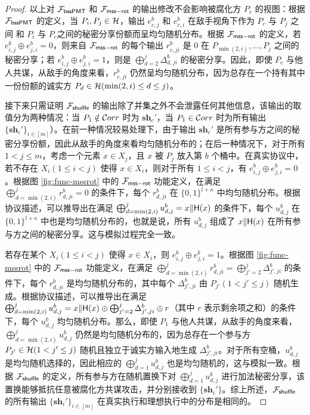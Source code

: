 \begin{proof}
以上对 $\mathcal{F}_\mathsf{bssPMT}$ 和 $\mathcal{F}_\mathsf{mss\mathsf{-}rot}$ 的输出修改不会影响被腐化方 $P_c$ 的视图：根据 $\mathcal{F}_\mathsf{bssPMT}$ 的定义，当 $P_i, P_j \in \mathcal{H}$，输出 $e_{c,j}^b$ 和 $e_{c,i}^b$ 在敌手视角下作为 $P_c$ 与 $P_j$ 之间 和 $P_i$ 与 $P_c$之间的秘密分享份额而呈均匀随机分布。根据 $\mathcal{F}_\mathsf{mss\mathsf{-}rot}$ 的定义，若 $e_{i,j}^b \oplus e_{j,i}^b = 0$，则来自 $\mathcal{F}_\mathsf{mss\mathsf{-}rot}$ 的每个输出 $r_{c,ji}^b$ 是 $0$ 在 $P_{\min(2,i)}, \dots, P_j$ 之间的秘密分享；若 $e_{i,j}^b \oplus e_{j,i}^b = 1$，则是 $\bigoplus_{d=2}^j \Delta_{d,ji}^b$ 的秘密分享。因此，即使 $P_c$ 与他人共谋，从敌手的角度来看，$r_{c,ji}^b$ 仍然呈均匀随机分布，因为总存在一个持有其中一份份额的诚实方 $P_d \in \mathcal{H} (\min(2,i) \le d \le j)$。

接下来只需证明 $\mathcal{F}_\mathsf{shuffle}$ 的输出除了并集之外不会泄露任何其他信息，该输出的取值分为两种情况：当 $P_1 \notin \mathcal{C}orr$ 时为 $\textbf{sh}_{c}'$，当 $P_1 \in \mathcal{C}orr$ 时为所有输出 $\{\textbf{sh}_{i}'\}_{i \in [m]}$）。在前一种情况较易处理下，由于输出 $\textbf{sh}_{c}'$ 是所有参与方之间的秘密分享份额，因此从敌手的角度来看均匀随机分布的；在后一种情况下，对于所有 $1 < j \le m$，考虑一个元素 $x \in X_j$，且 $x$ 被 $P_j$ 放入第 $b$ 个桶中。在真实协议中，若不存在 $X_i (1 \le i < j)$ 使得 $x \in X_i$，则对于所有 $1 \le i < j$，有 $e_{i,j}^b \oplus e_{j,i}^b = 0$。根据图 \ref{fig:func-mssrot} 中的 $\mathcal{F}_\mathsf{mss\mathsf{-}rot}$ 功能定义，在满足 $\bigoplus_{d=\min(2,i)}^j r_{d,ji}^b = 0$ 的条件下，每个 $r_{d,ji}^b$ 在 $\{0,1\}^{l+\kappa}$ 中均匀随机分布。根据协议描述，可以推导出在满足 $\bigoplus_{d=\min(2,i)}^j u_{d,j}^b = x \Vert \mathsf{H}(x)$ 的条件下，每个 $u_{d,j}^b$ 在 $\{0,1\}^{l+\kappa}$ 中也是均匀随机分布的，也就是说，所有 $u_{d,j}^b$ 组成了 $x \Vert \mathsf{H}(x)$ 在所有参与方之间的秘密分享。这与模拟过程完全一致。

若存在某个 $X_i (1 \le i < j)$ 使得 $x \in X_i$，则 $e_{i,j}^b \oplus e_{j,i}^b = 1$。根据图 \ref{fig:func-mssrot} 中的 $\mathcal{F}_\mathsf{mss\mathsf{-}rot}$ 功能定义，在满足 $\bigoplus_{d=\min(2,i)}^j r_{d,ji}^b = \bigoplus_{j'=2}^j \Delta_{j',ji}^b$ 的条件下，每个 $r_{d,ji}^b$ 是均匀随机分布的，其中每个 $\Delta_{j',ji}^b$ 由 $P_{j'} (1 < j' \le j)$ 随机生成。根据协议描述，可以推导出在满足 $\bigoplus_{d=\min(2,i)}^j u_{d,j}^b = x \Vert \mathsf{H}(x) \oplus \bigoplus_{j'=2}^j \Delta_{j',ji}^b \oplus r$（其中 $r$ 表示剩余项之和）的条件下，每个 $u_{d,j}^b$ 均匀随机分布。那么，即使 $P_1$ 与他人共谋，从敌手的角度来看，$\bigoplus_{d=\min(2,i)}^j u_{d,j}^b$ 仍然是均匀随机分布的，因为总存在一个参与方 $P_{j'} \in \mathcal{H} (1 < j' \le j)$ 随机且独立于诚实方输入地生成 $\Delta_{j',ji}^b$。对于所有空桶，$u_{d,j}^b$ 是均匀随机选择的，因此相应的 $\bigoplus_{d=1}^j u_{d,j}^b$ 也是均匀随机的，这与模拟一致。根据 $\mathcal{F}_\mathsf{shuffle}$ 的定义，所有参与方在随机置换下对 $\bigoplus_{d=1}^j u_{d,j}^b$ 进行加法秘密分享，该置换能够抵抗任意被腐化方共谋攻击，并分别接收到 $\{\textbf{sh}_{i}'\}$。综上所述，$\mathcal{F}_\mathsf{shuffle}$ 的所有输出 $\{\textbf{sh}_{i}'\}_{i \in [m]}$ 在真实执行和理想执行中的分布是相同的。
\end{proof}

